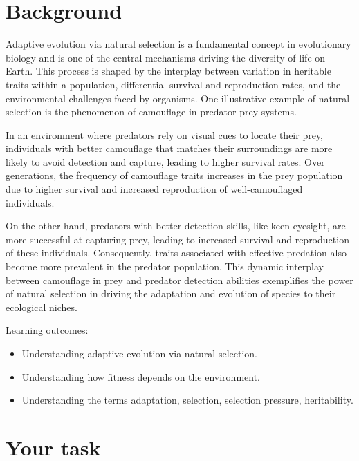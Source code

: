\documentclass[
  a4paper]{book}
\providecommand{\tightlist}{%
  \setlength{\itemsep}{0pt}\setlength{\parskip}{0pt}}
\begin{document}
\section{Background}\label{background-1}

Adaptive evolution via natural selection is a fundamental concept in evolutionary biology and is one of the central mechanisms driving the diversity of life on Earth. This process is shaped by the interplay between variation in heritable traits within a population, differential survival and reproduction rates, and the environmental challenges faced by organisms. One illustrative example of natural selection is the phenomenon of camouflage in predator-prey systems.

In an environment where predators rely on visual cues to locate their prey, individuals with better camouflage that matches their surroundings are more likely to avoid detection and capture, leading to higher survival rates. Over generations, the frequency of camouflage traits increases in the prey population due to higher survival and increased reproduction of well-camouflaged individuals.

On the other hand, predators with better detection skills, like keen eyesight, are more successful at capturing prey, leading to increased survival and reproduction of these individuals. Consequently, traits associated with effective predation also become more prevalent in the predator population. This dynamic interplay between camouflage in prey and predator detection abilities exemplifies the power of natural selection in driving the adaptation and evolution of species to their ecological niches.

\begin{do-something}
Learning outcomes:

\begin{itemize}
\tightlist
\item
  Understanding adaptive evolution via natural selection.
\item
  Understanding how fitness depends on the environment.
\item
  Understanding the terms adaptation, selection, selection pressure,
  heritability.
\end{itemize}
\end{do-something}

\section{Your task}\label{your-task-1}
\end{document}
